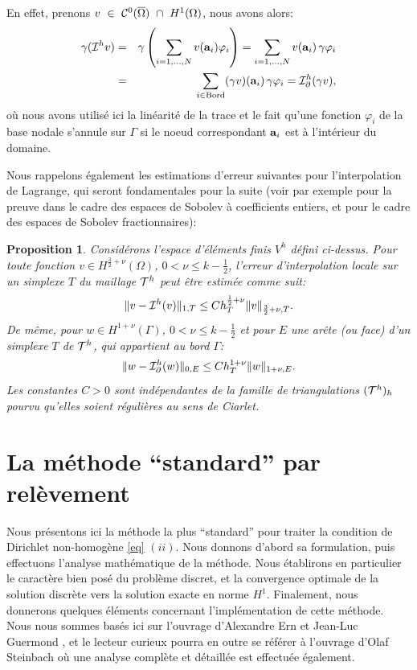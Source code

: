 \documentclass[11pt]{book}
\newtheorem{proposition}[theorem]{Proposition}
\newcommand{\beqs}{\begin{eqnarray*}}
\newcommand{\eeqs}{\end{eqnarray*}}
\newcommand{\bp}{\begin{proposition}}
\newcommand{\ep}{\end{proposition}}
\newcommand{\cqfd}{{$\mbox{}$\hfill$\square$}}
\def\a{{\bf a}}
\newcommand{\caI}{{\cal I}}
\newcommand{\caC}{{\cal C}}
\newcommand{\caT}{{\cal T}}
\begin{document}
En effet, prenons 
$v~\in~\caC^0(\overline{\Omega})~\cap~H^1(\Omega)$, nous avons alors:
\beqs
\gamma (\caI^h v ) & = & \gamma \left ( \sum_{i=1,\ldots,N} v(\a_i) \varphi_i \right )
= \sum_{i=1,\ldots,N} v(\a_i)\, \gamma  \varphi_i  \\
&=& \sum_{i \in \mathrm{Bord}} (\gamma v)(\a_i) \, \gamma \varphi_i   
= \caI^h_\partial ( \gamma v),
\eeqs
où nous avons utilisé ici la linéarité de la trace et le fait qu'une fonction $\varphi_i$ de la base nodale s'annule sur $\Gamma$ si le noeud correspondant $\a_i$ est à l'intérieur du domaine.

Nous rappelons également les estimations d'erreur suivantes pour l'interpolation de Lagrange, qui seront fondamentales pour la suite (voir par exemple \cite[Theorem 1.103]{ern-guermond-04} pour la preuve dans le cadre des espaces de Sobolev à coefficients entiers, et \cite[Example 3, p.460]{dupont-scott-80} pour le cadre des espaces de Sobolev fractionnaires):

\bp \label{prop:interLagrange} Considérons l'espace d'éléments finis $V^h$ défini ci-dessus. Pour toute fonction $v \in H^{\frac32+\nu} (\Omega)$, $0 < \nu \leq k - \frac12$, l'erreur d'interpolation locale sur un simplexe $T$ du maillage $\caT^h$ peut être estimée comme suit:
\[
 \| v - \caI^h(v) \|_{1,T} \leq C h_T^{\frac12+\nu} \| v \|_{\frac32+\nu,T}.
\]
De même, pour $w\in H^{1+\nu}(\Gamma)$, $0 < \nu \leq k - \frac12$ et pour $E$ une arête (ou face) d'un simplexe $T$ de $\caT^h$, qui appartient au bord $\Gamma$:
\[
 \| w - \caI^h_\partial(w) \|_{0,E} \leq C h_T^{1+\nu} \| w \|_{1+\nu,E}.
\]
Les constantes $C>0$ sont indépendantes de la famille de triangulations $( \caT^h )_h$ pourvu qu'elles soient régulières au sens de Ciarlet.
\ep


\section{La méthode ``standard'' par relèvement}

Nous présentons ici la méthode la plus ``standard'' pour traiter la condition de Dirichlet non-homogène \eqref{eq} $(ii)$. 
Nous donnons d'abord sa formulation, puis effectuons l'analyse mathématique de la méthode. Nous établirons en particulier le caractère bien posé du problème discret, et la convergence optimale de la solution discrète vers la solution exacte en norme $H^1$. Finalement, nous donnerons quelques éléments concernant l'implémentation de cette méthode. Nous nous sommes basés ici sur l'ouvrage d'Alexandre Ern et Jean-Luc Guermond \cite[Section 3.2, Section 8.4]{ern-guermond-04}, %
et le lecteur curieux pourra en outre se référer à l'ouvrage d'Olaf Steinbach \cite[Section 11.1]{steinbach-2008} où une analyse complète et détaillée est effectuée également.
\end{document}
